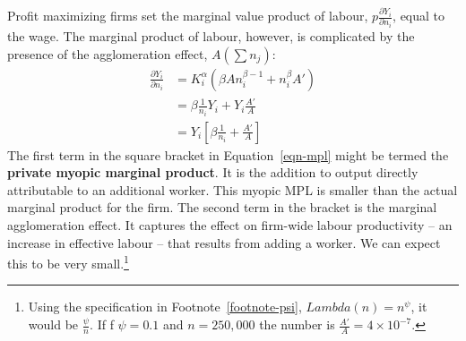 
Profit maximizing firms  set the marginal value product of labour, $p\frac{\partial Y_i}{\partial n_i}$, equal to the wage. The marginal product of labour, however,  is complicated by the presence of the  agglomeration effect, $A(\sum n_j)$:
\begin{eqnarray} \frac{\partial Y_i}{\partial n_i} &=   K_i^\alpha \left(  \beta A n_i^{\beta-1}  + n_i^{\beta}A'  \right)  \nonumber\\
&=   \beta\frac{1}{n_i} Y_i   +  Y_i \frac{A'}{A}  \nonumber\\
&=   Y_i  \left[  \beta\frac{1}{n_i}  + \frac{A' }{A} \right]   \label{eqn-mpl}
\end{eqnarray}
The first term in the square bracket in Equation~\ref{eqn-mpl} might be termed the \textbf{private myopic marginal product}. It is the addition to output directly attributable to an additional worker. This myopic MPL is smaller than the actual marginal product for the firm.  
The second term in the bracket   is the marginal agglomeration effect. It captures the effect on firm-wide labour productivity -- an increase in effective labour --   that results from adding a worker. We can expect this to be very small.\footnote{Using the specification in Footnote~\ref{footnote-psi}, $Lambda(n)=n^\psi$, it would be $\frac{\psi}{n}$. If f $\psi=0.1$ and $n=250,000$ the number is $\frac{A' }{A} =4\times 10^{-7}$.}%



